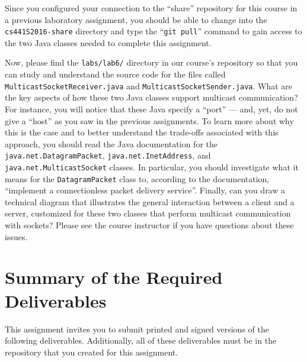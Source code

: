 Since you configured your connection to the ``share'' repository for this course in a previous laboratory assignment,
you should be able to change into the {\tt cs441S2016-share} directory and type the ``{\tt git pull}'' command to gain
access to the two Java classes needed to complete this assignment.

\begin{sloppypar}
  Now, please find the {\tt labs/lab6/} directory in our course's repository so that you can study and understand the
  source code for the files called {\tt MulticastSocketReceiver.java} and {\tt MulticastSocketSender.java}. What are the
  key aspects of how these two Java classes support multicast communication? For instance, you will notice that these
  Java specify a ``port'' --- and, yet, do not give a ``host'' as you saw in the previous assignments. To learn more
  about why this is the case and to better understand the trade-offs associated with this approach, you should read the
  Java documentation for the {\tt java.net.DatagramPacket}, {\tt java.net.InetAddress}, and {\tt
  java.net.MulticastSocket} classes. In particular, you should investigate what it means for the {\tt DatagramPacket}
  class to, according to the documentation, ``implement a connectionless packet delivery service''.  Finally, can you
  draw a technical diagram that illustrates the general interaction between a client and a server, customized for these
  two classes that perform multicast communication with sockets? Please see the course instructor if you have questions
  about these issues.
\end{sloppypar}




\section*{Summary of the Required Deliverables}

This assignment invites you to submit printed and signed versions of the following deliverables. Additionally,
all of these deliverables must be in the repository that you created for this assignment.

\vspace*{-.15in}


